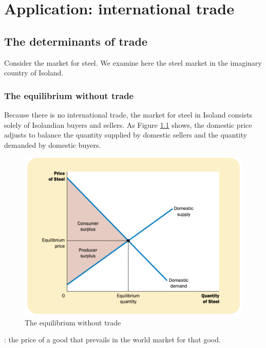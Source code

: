 
\chapter{Application: international trade}

\section{The determinants of trade}

Consider the market for steel.
We examine here the steel market in the imaginary country of Isoland.


\subsection{The equilibrium without trade}


Because there is no international trade, the market for steel in Isoland consists solely of Isolandian buyers and sellers.
As Figure \ref{fig:equilibrium-without-international-trade} shows, the domestic price adjusts to balance the quantity supplied by domestic sellers and the quantity demanded by domestic buyers.

\begin{figure}[!ht]
  \centering
  \includegraphics[width=\textwidth]{pics/the-equilibrium-without-international-trade}
  \caption{The equilibrium without trade}
  \label{fig:equilibrium-without-international-trade}
\end{figure}



: the price of a good that prevails in the world market for that good.


